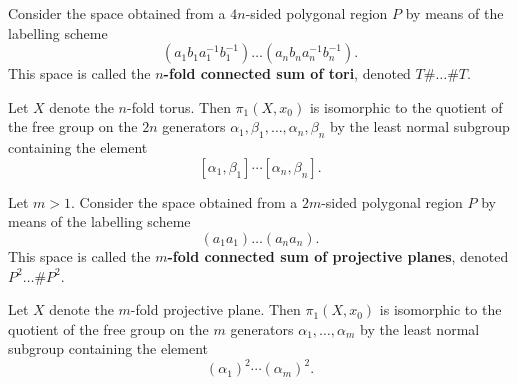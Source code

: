 \begin{definition}
    Consider the space obtained from a $4n$-sided polygonal region $P$ by means of the labelling scheme
    \[
        (a_1b_1a_1^{-1}b_1^{-1}) \dots (a_nb_na_n^{-1}b_n^{-1}).
    \]
    This space is called the \textbf{$n$-fold connected sum of tori}, denoted $T \# \dots \# T$.
\end{definition}
    
\begin{theorem}
Let $X$ denote the $n$-fold torus. Then $\pi_1(X, x_0)$ is isomorphic to the quotient of the free group on the $2n$ generators $\alpha_1, \beta_1, \dots, \alpha_n, \beta_n$ by the least normal subgroup containing the element
\[
    [\alpha_1, \beta_1] \cdots [\alpha_n, \beta_n]. 
\]
\end{theorem}

\begin{definition}
Let $m > 1$. Consider the space obtained from a $2m$-sided polygonal region $P$ by means of the labelling scheme
\[
    (a_1a_1) \dots (a_na_n).
\]
This space is called the \textbf{$m$-fold connected sum of projective planes}, denoted $P^2 \dots \# P^2$.
\end{definition}

\begin{theorem}
Let $X$ denote the $m$-fold projective plane. Then $\pi_1(X, x_0)$ is isomorphic to the quotient of the free group on the $m$ generators $\alpha_1, \dots, \alpha_m$ by the least normal subgroup containing the element
\[
    (\alpha_1)^2\cdots (\alpha_m)^2.
\]
\end{theorem}
    